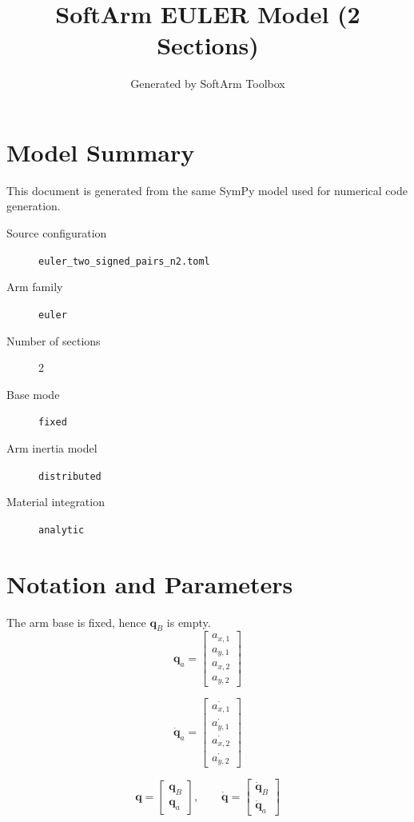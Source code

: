 \documentclass[11pt]{article}
\title{SoftArm EULER Model (2 Sections)}
\author{Generated by SoftArm Toolbox}
\date{}
\begin{document}
\maketitle

\section{Model Summary}
This document is generated from the same SymPy model used for numerical code generation.
\begin{description}
\item[Source configuration] \texttt{euler\_two\_signed\_pairs\_n2.toml}
\item[Arm family] \texttt{euler}
\item[Number of sections] 2
\item[Base mode] \texttt{fixed}
\item[Arm inertia model] \texttt{distributed}
\item[Material integration] \texttt{analytic}
\end{description}

\section{Notation and Parameters}
The arm base is fixed, hence $\boldsymbol q_B$ is empty.
\begin{equation}
\boldsymbol q_a=\begin{bmatrix}a_{x,1}\\a_{y,1}\\a_{x,2}\\a_{y,2}\end{bmatrix}
\end{equation}

\begin{equation}
\dot{\boldsymbol q}_a=\begin{bmatrix}\dot{a_{x,1}}\\\dot{a_{y,1}}\\\dot{a_{x,2}}\\\dot{a_{y,2}}\end{bmatrix}
\end{equation}

\begin{equation}
\boldsymbol q=\begin{bmatrix}\boldsymbol q_B\\\boldsymbol q_a\end{bmatrix},\qquad \dot{\boldsymbol q}=\begin{bmatrix}\dot{\boldsymbol q}_B\\\dot{\boldsymbol q}_a\end{bmatrix}
\end{equation}
\end{document}
